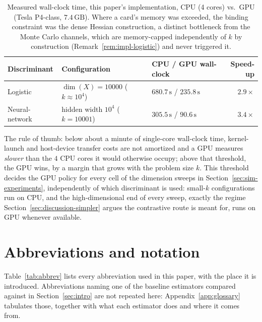 \documentclass[11pt]{article}
\theoremstyle{plain}
\theoremstyle{definition}
\theoremstyle{remark}
\newcommand{\ks}{k}
\begin{document}
\begin{table}[htbp]
\centering
\begin{tabular}{@{}lllr@{}}
\toprule
Discriminant & Configuration & CPU / GPU wall-clock & Speed-up \\
\midrule
Logistic & $\dim(X)=10000$ ($\ks\approx 10^4$) & $680.7\,\mathrm{s}$ / $235.8\,\mathrm{s}$ & $2.9\times$ \\
Neural-network & hidden width $10^4$ ($\ks=10001$) & $305.5\,\mathrm{s}$ / $90.6\,\mathrm{s}$ & $3.4\times$ \\
%
%
\bottomrule
\end{tabular}
\caption{Measured wall-clock time, this paper's implementation, CPU (4 cores) vs.\ GPU (Tesla
P4-class, $7.4\,\mathrm{GB}$). Where a card's memory was exceeded, the binding constraint was the
dense Hessian construction, a distinct bottleneck
from the Monte Carlo channels, which are memory-capped independently of $\ks$ by construction
(Remark~\ref{rem:impl-logistic}) and never triggered it.}
\label{tab:compute-gpu}
\end{table}

The rule of thumb: below about a minute of single-core wall-clock time, kernel-launch and
host-device transfer costs are not amortized and a GPU measures \emph{slower} than the $4$ CPU
cores it would otherwise occupy; above that threshold, the GPU wins, by a margin that grows
with the problem size $\ks$. This threshold decides the GPU policy for every cell of the
dimension sweeps in Section~\ref{sec:sim-experiments}, independently of which discriminant is used:
small-$\ks$ configurations run on CPU, and the high-dimensional end of every sweep, exactly
the regime Section~\ref{sec:discussion-simpler} argues the contrastive route is meant for,
runs on GPU whenever available.

\section{Abbreviations and notation}
\label{app:abbrev}

Table~\ref{tab:abbrev} lists every abbreviation used in this paper, with the place it is
introduced. Abbreviations naming one of the baseline estimators compared against in
Section~\ref{sec:intro} are not repeated here: Appendix~\ref{app:glossary} tabulates those,
together with what each estimator does and where it comes from.
\end{document}
